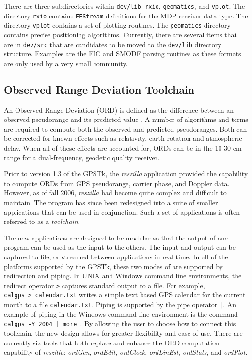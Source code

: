 \documentclass[letterpaper,ugly,10pt]{ion-gps}
\newcommand{\gpstkapp}[1]{\textit{\mbox{#1}}}
\newcommand{\gpstkdir}[1]{\texttt{\mbox{#1}}}
\newcommand{\gpstkcommand}[1]{\texttt{\mbox{#1}}}
\newcommand{\gpstkclass}[1]{\texttt{\mbox{#1}}}
\begin{document}
There are three subdirectories within \gpstkdir{dev/lib}: \gpstkdir{rxio}, \gpstkdir{geomatics}, and \gpstkdir{vplot}. The directory \gpstkdir{rxio} contains \gpstkclass{FFStream} definitions for the MDP receiver data type. The directory \gpstkdir{vplot} contains a set of plotting routines. The \gpstkdir{geomatics} directory contains precise positioning algorithms. Currently, there are several items that are in \gpstkdir{dev/src} that are candidates to be moved to the \gpstkdir{dev/lib} directory structure. Examples are the FIC and SMODF parsing routines as these formats are only used by a very small community.

\subsection*{Observed Range Deviation Toolchain}
An Observed Range Deviation (ORD) is defined as the difference between an observed pseudorange and its predicted value \cite[p.465]{ps:gta}. A number of algorithms and terms are required to compute both the observed and predicted pseudoranges. Both can be corrected for known effects such as relativity, earth rotation and atmospheric delay. When all of these effects are accounted for, ORDs can be in the 10-30 cm range for a dual-frequency, geodetic quality receiver.

Prior to version 1.3 of the GPSTk, the \gpstkapp{reszilla} application provided the capability to compute ORDs from GPS pseudorange, carrier phase, and Doppler data. However, as of fall 2006, \gpstkapp{reszilla} had become quite complex and difficult to maintain. The program has since been redesigned into a suite of smaller applications that can be used in conjunction. Such a set of applications is often referred to as a \emph{toolchain}.

The new applications are designed to be modular so that the output of one program can be used as the input to the others. The input and output can be captured to file, or streamed between applications in real time. In all of the platforms supported by the GPSTk, these two modes of are supported by redirection and piping. In UNIX and Windows command line environments, the redirect operator \gpstkcommand{>} captures standard output to a file. For example, 
\gpstkcommand{calgps > calendar.txt} writes a simple text based GPS calendar for the current month to a file \gpstkdir{calendar.txt}. Piping is supported by the pipe operator \gpstkcommand{|}. An example of piping in the Windows command line environment is the command \gpstkcommand{calgps -Y 2004 | more }. By allowing the user to choose how to connect this toolchain, the new design allows for greater flexibility and ease of use. There are currently six tools that both replace and enhance the ORD computation capability of \gpstkapp{reszilla}: \gpstkapp{ordGen}, \gpstkapp{ordEdit}, \gpstkapp{ordClock}, \gpstkapp{ordLinEst}, \gpstkapp{ordStats}, and \gpstkapp{ordPlot}.
\end{document}
